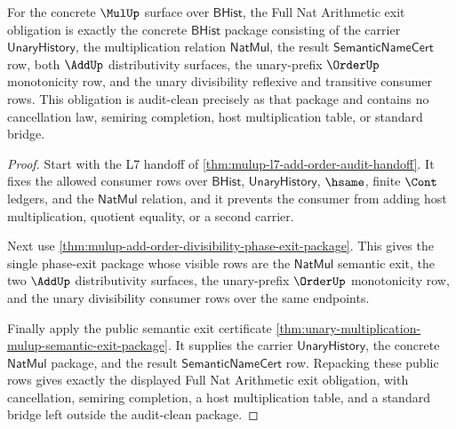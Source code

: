 \begin{theorem}
\label{thm:mulup-l7-audit-clean-exit-obligation}
For the concrete $\MulUp$ surface over $\mathsf{BHist}$, the Full Nat
Arithmetic exit obligation is exactly the concrete $\mathsf{BHist}$ package
consisting of the carrier $\mathsf{UnaryHistory}$, the multiplication relation
$\mathsf{NatMul}$, the result $\mathsf{SemanticNameCert}$ row, both $\AddUp$
distributivity surfaces, the unary-prefix $\OrderUp$ monotonicity row, and the
unary divisibility reflexive and transitive consumer rows. This obligation is
audit-clean precisely as that package and contains no cancellation law,
semiring completion, host multiplication table, or standard bridge.
\end{theorem}
\begin{proof}
Start with the L7 handoff of
\autoref{thm:mulup-l7-add-order-audit-handoff}. It fixes the allowed consumer
rows over $\mathsf{BHist}$, $\mathsf{UnaryHistory}$, $\hsame$, finite $\Cont$
ledgers, and the $\mathsf{NatMul}$ relation, and it prevents the consumer from
adding host multiplication, quotient equality, or a second carrier.

Next use \autoref{thm:mulup-add-order-divisibility-phase-exit-package}. This
gives the single phase-exit package whose visible rows are the
$\mathsf{NatMul}$ semantic exit, the two $\AddUp$ distributivity surfaces, the
unary-prefix $\OrderUp$ monotonicity row, and the unary divisibility consumer
rows over the same endpoints.

Finally apply the public semantic exit certificate
\autoref{thm:unary-multiplication-mulup-semantic-exit-package}. It supplies the
carrier $\mathsf{UnaryHistory}$, the concrete $\mathsf{NatMul}$ package, and
the result $\mathsf{SemanticNameCert}$ row. Repacking these public rows gives
exactly the displayed Full Nat Arithmetic exit obligation, with cancellation,
semiring completion, a host multiplication table, and a standard bridge left
outside the audit-clean package.
\end{proof}

